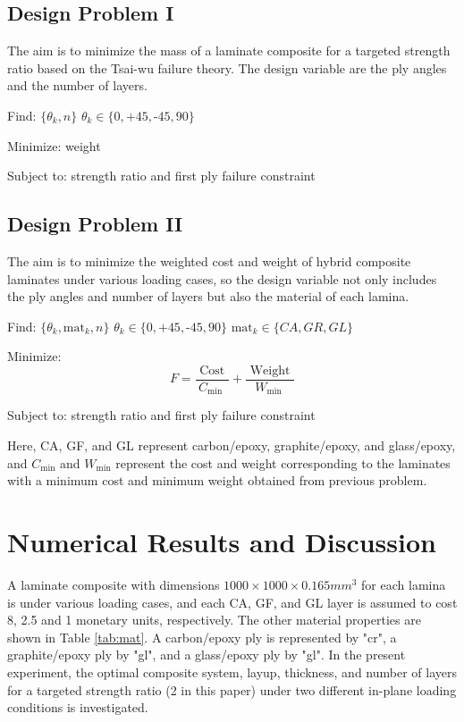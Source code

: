 \documentclass[USenglish,twocolumn]{article}
\begin{document}
\subsection{Design Problem I}

The aim is to minimize the mass of a laminate composite for a targeted strength
ratio based on the Tsai-wu failure theory. The design variable are the ply angles and the
number of layers.

Find: $\{\theta_k, n\}$ $\theta_k \in \{ 0,\text{+}45,\text{-}45,90\}$

Minimize: weight

Subject to: strength ratio and first ply failure constraint


\subsection{Design Problem II}
The aim is to minimize the weighted cost and weight of hybrid composite
laminates under various loading cases, so the design variable not only includes
the ply angles and number of layers but also the material of each lamina.


Find: $\{\theta_k,\text{mat}_k, n\}$ $\theta_k \in \{ 0,\text{+}45,\text{-}45,90\}$ $\text{mat}_k \in \{CA, GR, GL \}$

Minimize:
\begin{equation}
	F=\frac{\text { Cost }}{C_{\text {min }}}+\frac{\text { Weight }}{W_{\text {min }}}
\end{equation}

Subject to: strength ratio and first ply failure constraint


Here, CA, GF, and GL represent carbon/epoxy, graphite/epoxy, and glass/epoxy, and
$C_{\text{min}}$ and $W_{\text{min}}$ represent the cost and
weight corresponding to the laminates with a minimum cost and minimum weight
obtained from previous problem.

\section{Numerical Results and Discussion}
A laminate composite with dimensions $1000 \times 1000 \times 0.165 mm^3$ for
each lamina is under various loading cases, and each CA, GF, and GL layer is
assumed to cost 8, 2.5 and 1 monetary units, respectively. The other
material properties are shown in Table \ref{tab:mat}. A carbon/epoxy ply is represented by "cr", a
graphite/epoxy ply by "gl", and a glass/epoxy ply by "gl".  In the present
experiment, the optimal composite system, layup, thickness, and number of
layers for a targeted strength ratio (2 in this paper) under two different
in-plane loading conditions is investigated.
\end{document}
